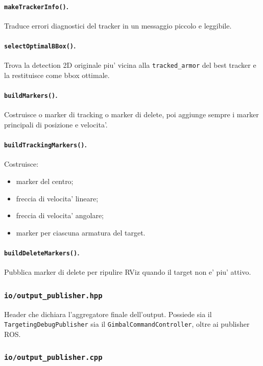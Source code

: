 \documentclass[11pt,a4paper]{article}
\newcommand{\code}[1]{\texttt{#1}}
\begin{document}
\paragraph{\code{makeTrackerInfo()}.}
Traduce errori diagnostici del tracker in un messaggio piccolo e leggibile.

\paragraph{\code{selectOptimalBBox()}.}
Trova la detection 2D originale piu' vicina alla \code{tracked\_armor} del best tracker e la restituisce come bbox ottimale.

\paragraph{\code{buildMarkers()}.}
Costruisce o marker di tracking o marker di delete, poi aggiunge sempre i marker principali di posizione e velocita'.

\paragraph{\code{buildTrackingMarkers()}.}
Costruisce:
\begin{itemize}[leftmargin=1.4em]
  \item marker del centro;
  \item freccia di velocita' lineare;
  \item freccia di velocita' angolare;
  \item marker per ciascuna armatura del target.
\end{itemize}

\paragraph{\code{buildDeleteMarkers()}.}
Pubblica marker di delete per ripulire RViz quando il target non e' piu' attivo.

\subsubsection{\code{io/output\_publisher.hpp}}

Header che dichiara l'aggregatore finale dell'output. Possiede sia il \code{TargetingDebugPublisher} sia il \code{GimbalCommandController}, oltre ai publisher ROS.

\subsubsection{\code{io/output\_publisher.cpp}}
\end{document}
